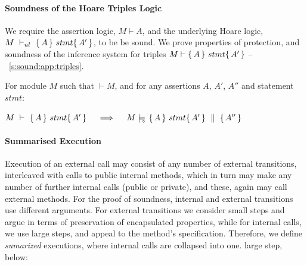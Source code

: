 
\paragraph{Soundness of the Hoare Triples Logic}
\label{sect:prove:triples:sound}

We require the assertion logic,  $M\vdash A$, and  the    underlying Hoare logic,  $M\ \vdash_{ul}\  \triple A {stmt} {A'}$,   to be be  sound. %
We   prove  properties of protection, and 
 soundness of the inference system for triples $M \vdash   \{\, A \, \}\ stmt \{\, A' \, \} $ -- \cf \A\ \ref{s:sound:app:triples}.

 

\begin{Theorem}
\label{l:triples:sound}
For module  $M$   such that  $\vdash M$, and for any assertions $A$,  $A'$, $A''$ and statement  $stmt$:
\begin{center}
$M\ \vdash\  \triple A {stmt} {A'}  \ \ \ \  \Longrightarrow  \ \ \ \ \satisfiesD {M} {\quadruple {A} {stmt} {A'} {A''}}$
\end{center}
\end{Theorem}
 

\paragraph{Summarised Execution}
\label{s:summaized}

Execution of an external call may consist of any number of external
transitions, interleaved with calls to public internal methods, which in
turn may make any number of further internal calls (public or private),  %
and these, again may call external methods.
For the   proof of soundness,  internal and external transitions use different arguments.
 For  external transitions we consider small steps  and  argue in terms of  preservation of  encapsulated properties,
while for internal calls, we use large steps, and appeal to the method's specification.
Therefore, we define  \emph{sumarized} executions, where  internal calls are collapsed into one. large step, \eg below:
  

\label{sect:termExecs}



